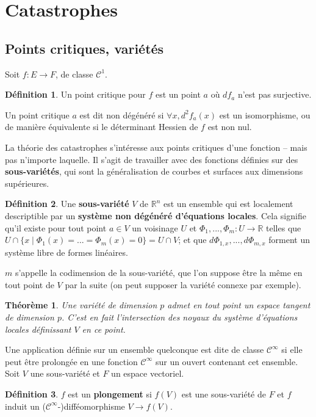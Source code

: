 \documentclass{article}
\newcommand{\cun}{\mathcal{C}^1}
\newcommand{\cinf}{\mathcal{C}^\infty}
\newcommand{\R}{\mathbb{R}}
\newtheorem{thm}{Théorème}
\theoremstyle{definition}
\newtheorem{defn}{Définition}
\begin{document}
\section{Catastrophes}

\subsection{Points critiques, variétés}

Soit $f:E\to F$, de classe $\cun$.
\begin{defn}
	Un point critique pour $f$ est un point $a$ où $df_a$ n'est pas surjective.

	Un point critique $a$ est dit non dégénéré si $\forall x, d^2f_a(x)$ est un isomorphisme, ou de manière équivalente si le déterminant Hessien de $f$ est non nul.
\end{defn}

La théorie des catastrophes s'intéresse aux points critiques d'une fonction -- mais pas n'importe laquelle.
Il s'agit de travailler avec des fonctions définies sur des \textbf{sous-variétés}, qui sont la généralisation de courbes et surfaces aux dimensions supérieures.

\begin{defn}
	Une \textbf{sous-variété} $V$ de $\R^n$ est un ensemble qui est localement descriptible par un \textbf{système non dégénéré d'équations locales}.
	Cela signifie qu'il existe pour tout point $a\in V$ un voisinage $U$ et $\Phi_1,...,\Phi_m: U \to\R$ telles que $U\cap\{x\mid \Phi_1(x)=...=\Phi_m(x)=0\}=U\cap V$; et que $d\Phi_{1,x},...,d\Phi_{m,x}$ forment un système libre de formes linéaires.

	$m$ s'appelle la codimension de la sous-variété, que l'on suppose être la même en tout point de $V$ par la suite (on peut supposer la variété connexe par exemple).
\end{defn}

\begin{thm}
	Une variété de dimension $p$ admet en tout point un espace tangent de dimension $p$.
	C'est en fait l'intersection des noyaux du système d'équations locales définissant $V$ en ce point.
\end{thm}

Une application définie sur un ensemble quelconque est dite de classe $\cinf$ si elle peut être prolongée en une fonction $\cinf$ sur un ouvert contenant cet ensemble. Soit $V$ une sous-variété et $F$ un espace vectoriel.

\begin{defn}

	$f$ est un \textbf{plongement} si $f(V)$ est une sous-variété de $F$ et $f$ induit un ($\cinf$-)difféomorphisme $V\to f(V)$.
\end{defn}
\end{document}
